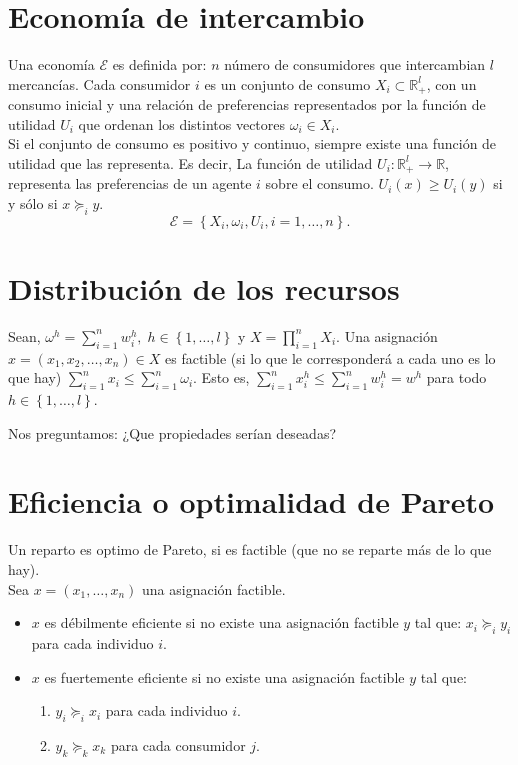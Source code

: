 \section{Economía de intercambio}

Una economía $\mathcal{E}$ es definida por: $n$ número de consumidores que intercambian $l$ mercancías. Cada consumidor $i$ es un conjunto de consumo $X_i\subset \mathbb{R}^l_+$, con un consumo inicial y una relación de preferencias representados por la función de utilidad $U_i$ que ordenan los distintos vectores $\omega_i\in X_i$.\\

Si el conjunto de consumo es positivo y continuo, siempre existe una función de utilidad que las representa. Es decir, La función de utilidad $U_i:\mathbb{R}^l_+\to \mathbb{R}$, representa las preferencias de un agente $i$ sobre el consumo. $U_i(x)\geq U_i(y)$ si y sólo si $x\succeq_i y$.\\
$$\mathcal{E}=\left\{X_i,\omega_i,U_i,i=1,\ldots,n\right\}.$$


\section{Distribución de los recursos}

Sean, $\displaystyle \omega^h=\sum_{i=1}^n w_i^h,\; h\in \left\{1,\ldots,l\right\}$ y  $\displaystyle X=\prod_{i=1}^n X_i$. Una asignación $x=\left(x_1,x_2,\ldots,x_n\right)\in X$ es factible (si lo que le corresponderá a cada uno es lo que hay) $\displaystyle\sum_{i=1}^n x_i\leq \sum_{i=1}^n \omega_i$. Esto es, $\displaystyle\sum_{i=1}^n x_i^h \leq \sum_{i=1}^n w_i^h = w^h$ para todo $h\in\left\{1,\ldots,l\right\}$.

Nos preguntamos: ¿Que propiedades serían deseadas?

\section{Eficiencia o optimalidad de Pareto}
Un reparto es optimo de Pareto, si es factible (que no se reparte más de lo que hay).\\

Sea $x=\left(x_1,\ldots,x_n\right)$ una asignación factible. 
\begin{itemize}
    \item $x$ es débilmente eficiente si no existe una asignación factible $y$ tal que: $x_i\succeq_i y_i$ para cada individuo $i$.
    \item $x$ es fuertemente eficiente si no existe una asignación factible $y$ tal que: 
	\begin{enumerate}
	    \item $y_i\succeq_i x_i$ para cada individuo $i$.
	    \item $y_k\succeq_k x_k$ para cada consumidor $j$.
	\end{enumerate}
\end{itemize}

